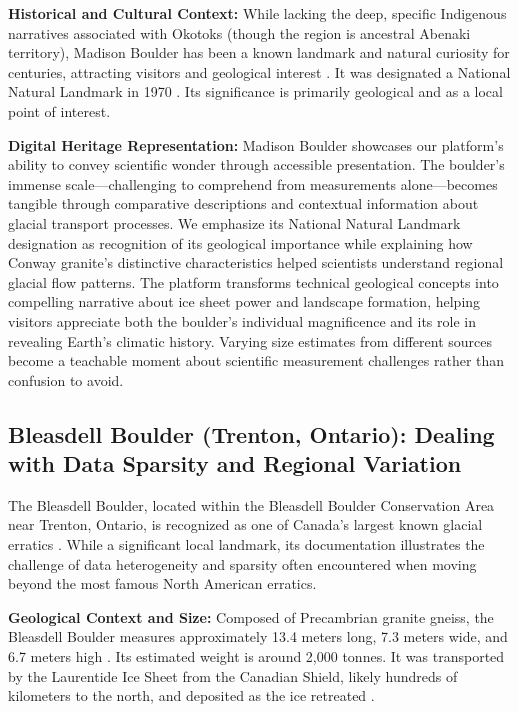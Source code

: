 \textbf{Historical and Cultural Context:} While lacking the deep, specific Indigenous narratives associated with Okotoks (though the region is ancestral Abenaki territory), Madison Boulder has been a known landmark and natural curiosity for centuries, attracting visitors and geological interest \cite{NHMadisonBoulder}. It was designated a National Natural Landmark in 1970 \cite{NPSMadisonBoulder}. Its significance is primarily geological and as a local point of interest.

\textbf{Digital Heritage Representation:} Madison Boulder showcases our platform's ability to convey scientific wonder through accessible presentation. The boulder's immense scale—challenging to comprehend from measurements alone—becomes tangible through comparative descriptions and contextual information about glacial transport processes. We emphasize its National Natural Landmark designation as recognition of its geological importance while explaining how Conway granite's distinctive characteristics helped scientists understand regional glacial flow patterns. The platform transforms technical geological concepts into compelling narrative about ice sheet power and landscape formation, helping visitors appreciate both the boulder's individual magnificence and its role in revealing Earth's climatic history. Varying size estimates from different sources become a teachable moment about scientific measurement challenges rather than confusion to avoid.

\subsection{Bleasdell Boulder (Trenton, Ontario): Dealing with Data Sparsity and Regional Variation}
\label{subsec:bleasdell}

The Bleasdell Boulder, located within the Bleasdell Boulder Conservation Area near Trenton, Ontario, is recognized as one of Canada's largest known glacial erratics \cite{LTCBleasdell, Chapman1984}. While a significant local landmark, its documentation illustrates the challenge of data heterogeneity and sparsity often encountered when moving beyond the most famous North American erratics.

\textbf{Geological Context and Size:} Composed of Precambrian granite gneiss, the Bleasdell Boulder measures approximately 13.4 meters long, 7.3 meters wide, and 6.7 meters high \cite{LTCBleasdell}. Its estimated weight is around 2,000 tonnes. It was transported by the Laurentide Ice Sheet from the Canadian Shield, likely hundreds of kilometers to the north, and deposited as the ice retreated \cite{Chapman1984}.

